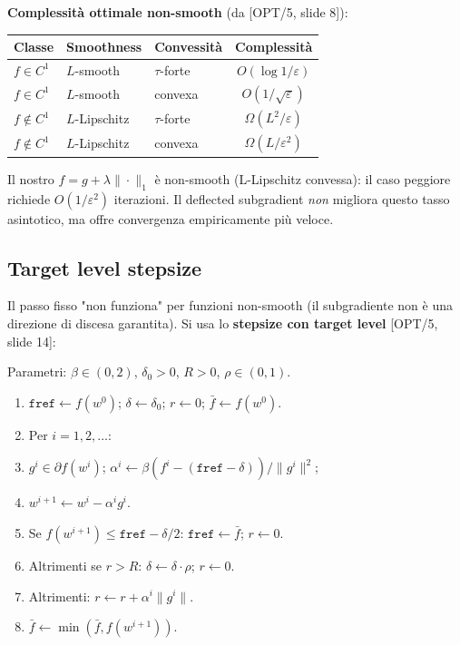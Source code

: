 \documentclass[11pt, a4paper, twoside]{book}
\theoremstyle{definition}
\theoremstyle{plain}
\theoremstyle{remark}
\begin{document}
\textbf{Complessità ottimale non-smooth} (da [OPT/5, slide 8]):
\begin{center}
\renewcommand{\arraystretch}{1.2}
\begin{tabular}{lllc}
\hline
Classe & Smoothness & Convessità & Complessità \\
\hline
$f \in C^1$ & $L$-smooth & $\tau$-forte & $O(\log 1/\varepsilon)$ \\
$f \in C^1$ & $L$-smooth & convexa & $O(1/\sqrt{\varepsilon})$ \\
$f \notin C^1$ & $L$-Lipschitz & $\tau$-forte & $\Omega(L^2/\varepsilon)$ \\
$f \notin C^1$ & $L$-Lipschitz & convexa & $\Omega(L/\varepsilon^2)$ \\
\hline
\end{tabular}
\end{center}
Il nostro $f = g + \lambda\|\cdot\|_1$ è non-smooth (L-Lipschitz convessa): il caso peggiore
richiede $O(1/\varepsilon^2)$ iterazioni. Il deflected subgradient \emph{non} migliora questo tasso
asintotico, ma offre convergenza empiricamente più veloce.

\subsection{Target level stepsize}

Il passo fisso "non funziona" per funzioni non-smooth (il subgradiente non è una direzione di discesa
garantita). Si usa lo \textbf{stepsize con target level} [OPT/5, slide 14]:

\begin{algobox}
Parametri: $\beta \in (0,2)$, $\delta_0 > 0$, $R > 0$, $\rho \in (0,1)$.
\begin{enumerate}
  \item $\texttt{fref} \leftarrow f(w^0)$; $\delta \leftarrow \delta_0$; $r \leftarrow 0$; $\bar{f} \leftarrow f(w^0)$.
  \item Per $i = 1, 2, \ldots$:
  \item \quad $g^i \in \partial f(w^i)$; $\alpha^i \leftarrow \beta(f^i - (\texttt{fref} - \delta)) / \|g^i\|^2$;
  \item \quad $w^{i+1} \leftarrow w^i - \alpha^i g^i$.
  \item \quad Se $f(w^{i+1}) \leq \texttt{fref} - \delta/2$: $\texttt{fref} \leftarrow \bar{f}$; $r \leftarrow 0$.
  \item \quad Altrimenti se $r > R$: $\delta \leftarrow \delta \cdot \rho$; $r \leftarrow 0$.
  \item \quad Altrimenti: $r \leftarrow r + \alpha^i\|g^i\|$.
  \item \quad $\bar{f} \leftarrow \min(\bar{f}, f(w^{i+1}))$.
\end{enumerate}
\end{algobox}
\end{document}
